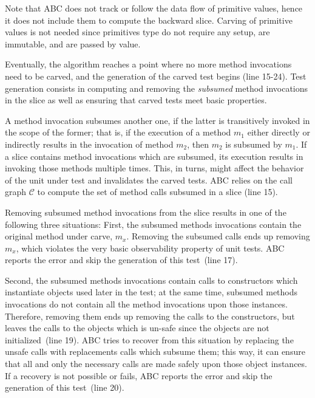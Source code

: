 \documentclass[10pt,conference]{IEEEtran}
\newcommand{\abc}{\textsf{ABC}\xspace}
\begin{document}
Note that \abc does not track or follow the data flow of primitive values, hence it does not include them to compute the backward slice.
Carving of primitive values is not needed since primitives type do not require any setup, are immutable, and are passed by value. 

Eventually, the algorithm reaches a point where no more method invocations need to be carved, 
and the generation of the carved test begins (line 15-24).
Test generation consists in computing and removing the \emph{subsumed} method invocations in the slice as
well as ensuring that carved tests meet basic properties.

A method invocation subsumes another one, if the latter is transitively invoked in the scope of the former;
that is, if the execution of a method $m_1$ either directly or indirectly results in the invocation of method $m_2$, 
then $m_2$ is subsumed by $m_1$.
%
If a slice contains method invocations which are subsumed, its execution results in invoking those methods multiple times.
This, in turns, might affect the behavior of the unit under test and invalidates the carved tests. 
\abc relies on the call graph $\mathcal{C}$ to compute the set of method calls subsumed in a slice (line 15).

Removing subsumed method invocations from the slice results in one of the following three situations:
First, the subsumed methods invocations contain the original method under carve, $m_x$. 
Removing the subsumed calls ends up removing $m_x$, which violates the very basic observability property of unit tests.
\abc reports the error and skip the generation of this test~(line 17).

Second, the subsumed methods invocations contain calls to constructors which instantiate objects used later in the test;
at the same time, subsumed methods invocations do not contain all the method invocations upon those instances. 
Therefore, removing them ends up removing the calls to the constructors, but leaves the calls to the objects which is un-safe
since the objects are not initialized~(line 19). \abc tries to recover from this situation by replacing
the unsafe calls with replacements calls which subsume them; this way, it can ensure that all and only the necessary calls
 are made safely upon those object instances. If a recovery is not possible or fails, \abc reports the error and
 skip the generation of  this test~(line 20).
\end{document}
